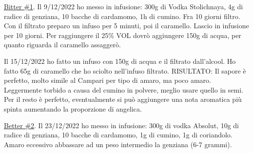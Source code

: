 \serves{-}%
\begin{ingreds}




\end{ingreds}

\begin{method}
\underline{Bitter \#1}. Il 9/12/2022 ho messo in infusione: 300g di Vodka Stolichnaya, 4g di radice di genziana, 10 bacche di cardamomo, 1h di cumino. Fra 10 giorni filtro. Con il filtrato preparo un infuso per 5 minuti, poi il caramello. Lascio in infusione per 10 giorni. Per raggiungere il 25\% VOL dovrò aggiungere 150g di acqua, per quanto riguarda il caramello assaggerò.

Il 15/12/2022 ho fatto un infuso con 150g di acqua e il filtrato dall'alcool. Ho fatto 65g di caramello che ho sciolto nell'infuso filtrato. RISULTATO: Il sapore è perfetto, molto simile al Campari per tipo di amaro, ma poco amaro. Leggermente torbido a causa del cumino in polvere, meglio usare quello in semi. Per il resto è perfetto, eventualmente si può aggiungere una nota aromatica più spinta aumentando la  proporzione di angelica.

\underline{Better \#2}. Il 23/12/2022 ho messo in infusione: 300g di vodka Absolut, 10g di radice di genziana, 10 bacche di cardamomo, 1g di cumino, 1g di coriandolo. Amaro eccessivo abbassare ad un peso intermedio la genziana (6-7 grammi).


\end{method}




